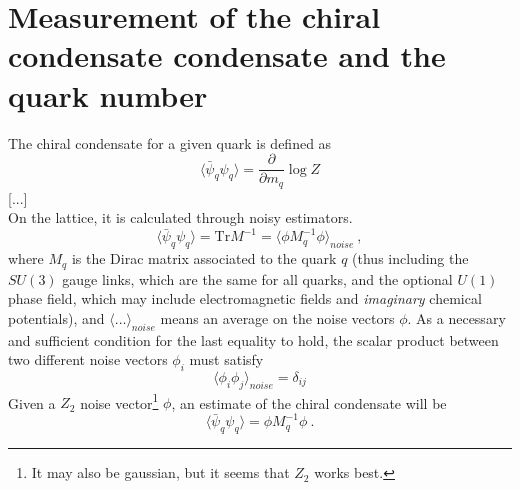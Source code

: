

\chapter{Measurement of the chiral condensate condensate and the quark number}

The chiral condensate for a given quark is defined as 
\begin{equation}
 \langle \bar{\psi}_q \psi_q \rangle = \frac{\partial}{\partial m_q} \log Z
\end{equation}
[...]\\
On the lattice, it is calculated through noisy estimators. 
\begin{equation}
 \langle \bar{\psi}_q \psi_q \rangle  = \textrm{Tr} M^{-1} = \langle \phi 
M_q^{-1} \phi \rangle_{noise} \ , 
\end{equation}
where $M_q$ is the Dirac matrix associated to the 
quark $q$ (thus including the $SU(3)$ gauge links, which are the same for all 
quarks, and the optional $U(1)$ phase field, which may include electromagnetic 
fields and \emph{imaginary} chemical potentials), and $\langle \ldots 
\rangle_{noise}$ means an average on the noise vectors $\phi$. As a necessary 
and sufficient condition for the last equality to hold, the scalar product 
between two different noise vectors $\phi_i$ must satisfy
\begin{equation}
 \langle \phi_i \phi_j \rangle_{noise} = \delta_{ij}
\end{equation}
Given a $Z_2$ noise vector\footnote{It may also be 
gaussian, but it 
seems that $Z_2$ works best.} $\phi$, an estimate of the chiral condensate will 
be
\begin{equation}
 \langle \bar{\psi}_q \psi_q \rangle  = \phi M_q^{-1} \phi \ .
\end{equation}


